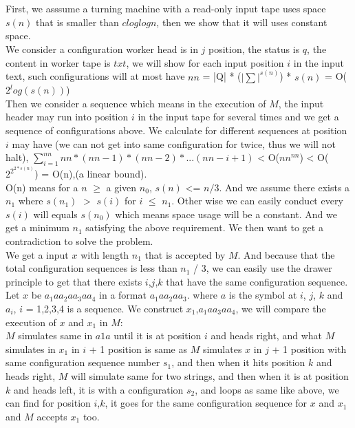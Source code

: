 \documentclass[11pt]{article}
\begin{document}
\part{}
First, we asssume a turning machine with a read-only input tape uses space $s(n)$ that is smaller than $c log log n$, then we show that it will uses constant space. \\
We consider a configuration worker head is in $j$ position, the status is $q$, the content in worker tape is $txt$, we will show for each input position $i$ in the input text, such configurations will at most have $nn$ = |Q| * ($|\sum|^{s(n)}$) * $s(n)$ = O($2^log(s(n))$) \\ 
Then we consider a sequence which means in the execution of $M$, the input header may run into position $i$ in the input tape for several times and we get a sequence of configurations above. We calculate for different sequences at position $i$ may have (we can not get into same configuration for twice, thus we will not halt), $\sum\limits_{i=1}^{nn} nn*(nn-1)*(nn-2)*...(nn-i+1)$ < O($nn^{nn}$) < O($2^{2^{2 * s(n)}}$) = O(n),(a linear bound). \\
O(n) means for a $n$ $\geq$ a given $n_{0}$, $s(n)$ <= $n / 3$. And we assume there exists a $n_{1}$ where $s(n_{1})$  $>$ $s(i)$ for $i$ $\leq$ $n_{1}$. Other wise we can easily conduct every $s(i)$ will equals $s(n_{0})$ which means space usage will be a constant. And we get a minimum $n_{1}$ satisfying the above requirement. We then want to get a contradiction to solve the problem. \\
We get a input $x$ with length $n_{1}$ that is accepted by $M$. And because that the total configuration sequences is less than $n_{1}$ / 3, we can easily use the drawer principle to get that there exists $i$,$j$,$k$ that have the same configuration sequence. Let $x$ be $a_{1}aa_{2}aa_{3}aa_{4}$  
in a format $a_{1}aa_{2}aa_{3}$. where $a$ is the symbol at $i$, $j$, $k$ and $a_{i}$, $i$ = 1,2,3,4 is a sequence. We construct $x_{1}$,$a_{1}aa_{3}aa_{4}$, we will compare the execution of $x$ and $x_{1}$ in $M$: \\
$M$ simulates same in $a{1}a$ until it is at position $i$ and heads right, and what $M$ simulates in $x_{1}$ in $i$ + 1 position is same as $M$ simulates
$x$ in $j$ + 1 position with same configuration sequence number $s_{1}$, and then when it hits position $k$ and heads right, $M$ will simulate same for two strings, and then when it is at position $k$ and heads left, it is with a configuration $s_{2}$, and loops as same like above, we can find for position $i$,$k$, it goes for the same configuration sequence for $x$ and $x_{1}$ and $M$ accepts $x_{1}$ too. \\
\end{document}
